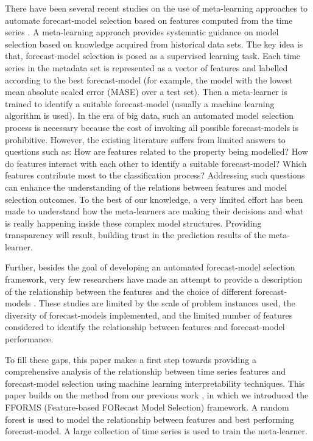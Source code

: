 \documentclass[11pt,a4paper,]{article}
\begin{document}
There have been several recent studies on the use of meta-learning approaches to automate forecast-model selection based on features computed from the time series \autocites{shah1997model}{prudencio2004meta}{lemke2010meta}{kuck2016meta}. A meta-learning approach provides systematic guidance on model selection based on knowledge acquired from historical data sets. The key idea is that, forecast-model selection is posed as a supervised learning task. Each time series in the metadata set is represented as a vector of features and labelled according to the best forecast-model (for example, the model with the lowest mean absolute scaled error (MASE) over a test set). Then a meta-learner is trained to identify a suitable forecast-model (usually a machine learning algorithm is used). In the era of big data, such an automated model selection process is necessary because the cost of invoking all possible forecast-models is prohibitive. However, the existing literature suffers from limited answers to questions such as: How are features related to the property being modelled? How do features interact with each other to identify a suitable forecast-model? Which features contribute most to the classification process? Addressing such questions can enhance the understanding of the relations between features and model selection outcomes. To the best of our knowledge, a very limited effort has been made to understand how the meta-learners are making their decisions and what is really happening inside these complex model structures. Providing transparency will result, building trust in the prediction results of the meta-learner.

Further, besides the goal of developing an automated forecast-model selection framework, very few researchers have made an attempt to provide a description of the relationship between the features and the choice of different forecast-models \autocites{schnaars1984situational}{wang2009rule}{lemke2010meta}[ are among some exceptions]{petropoulos2014horses}. These studies are limited by the scale of problem instances used, the diversity of forecast-models implemented, and the limited number of features considered to identify the relationship between features and forecast-model performance.

To fill these gaps, this paper makes a first step towards providing a comprehensive analysis of the relationship between time series features and forecast-model selection using machine learning interpretability techniques. This paper builds on the method from our previous work \textcite{fforms}, in which we introduced the FFORMS (Feature-based FORecast Model Selection) framework. A random forest is used to model the relationship between features and best performing forecast-model. A large collection of time series is used to train the meta-learner.
\end{document}
